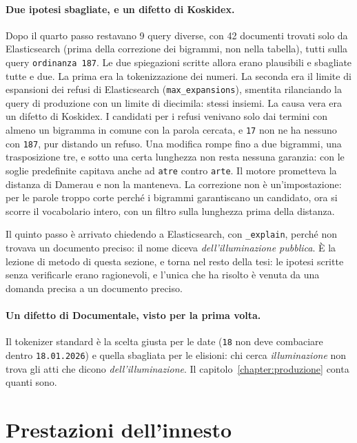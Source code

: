 \paragraph{Due ipotesi sbagliate, e un difetto di Koskidex.} Dopo il quarto passo
restavano 9 query diverse, con 42 documenti trovati solo da Elasticsearch (prima
della correzione dei bigrammi, non nella tabella), tutti
sulla query \texttt{ordinanza 187}. Le due spiegazioni scritte allora
erano plausibili e sbagliate tutte e due. La prima era la tokenizzazione dei
numeri. La seconda era il limite di espansioni dei refusi di Elasticsearch
(\texttt{max\_expansions}), smentita rilanciando la query di produzione con un
limite di diecimila: stessi insiemi. La causa vera era un difetto di Koskidex.
I candidati per i refusi venivano solo dai termini con almeno un bigramma in
comune con la parola cercata, e \texttt{17} non ne ha nessuno con \texttt{187},
pur distando un refuso. Una modifica rompe fino a due bigrammi, una
trasposizione tre, e sotto una certa lunghezza non resta nessuna garanzia: con
le soglie predefinite capitava anche ad \texttt{atre} contro \texttt{arte}. Il
motore prometteva la distanza di Damerau e non la manteneva. La correzione non è
un'impostazione: per le parole troppo corte perché i bigrammi garantiscano un
candidato, ora si scorre il vocabolario intero, con un filtro sulla lunghezza
prima della distanza.

Il quinto passo è arrivato chiedendo a Elasticsearch, con \texttt{\_explain},
perché non trovava un documento preciso: il nome diceva \emph{dell'illuminazione
pubblica}. È la lezione di metodo di questa sezione, e torna nel resto della
tesi: le ipotesi scritte senza verificarle erano ragionevoli, e l'unica che ha
risolto è venuta da una domanda precisa a un documento preciso.

\paragraph{Un difetto di Documentale, visto per la prima volta.} Il tokenizer
standard è la scelta giusta per le date (\texttt{18} non deve combaciare dentro
\texttt{18.01.2026}) e quella sbagliata per le elisioni: chi cerca
\emph{illuminazione} non trova gli atti che dicono \emph{dell'illuminazione}. Il
capitolo~\ref{chapter:produzione} conta quanti sono.

\section{Prestazioni dell'innesto}\label{sec:prestazioni-innesto}

